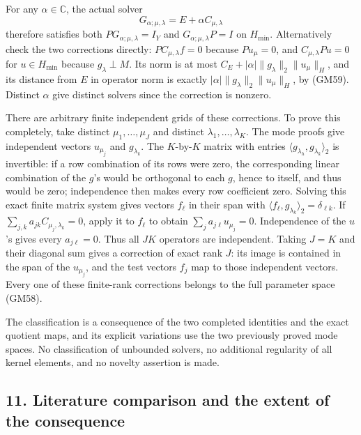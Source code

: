 \documentclass[
  11pt,
]{article}
\begin{document}
For any \(\alpha\in\mathbb C\), the actual solver
\[
 G_{\alpha;\mu,\lambda}=E+\alpha C_{\mu,\lambda}
\] therefore satisfies both
\(PG_{\alpha;\mu,\lambda}=I_Y\) and \(G_{\alpha;\mu,\lambda}P=I\) on
\(H_{\min}\). Alternatively check the two corrections
directly: \(PC_{\mu,\lambda}f=0\) because \(Pu_\mu=0\),
and \(C_{\mu,\lambda}Pu=0\) for \(u\in H_{\min}\) because
\(g_\lambda\perp M\). Its norm is at most
\(C_E+|\alpha|\|g_\lambda\|_2\|u_\mu\|_H\), and its distance from
\(E\) in operator norm is exactly
\(|\alpha|\|g_\lambda\|_2\|u_\mu\|_H\), by (GM59). Distinct
\(\alpha\) give distinct solvers since the correction is
nonzero.

There are arbitrary finite independent grids of these corrections. To
prove this completely, take distinct \(\mu_1,\ldots,\mu_J\) and
distinct \(\lambda_1,\ldots,\lambda_K\). The mode proofs give independent
vectors \(u_{\mu_j}\) and \(g_{\lambda_k}\). The
\(K\)-by-\(K\) matrix with
entries \(\langle g_{\lambda_h},g_{\lambda_k}\rangle_2\) is invertible: if a row combination
of its rows were zero, the corresponding linear combination of the
\(g\)'s would be orthogonal to each
\(g\), hence to itself, and thus would be zero;
independence then makes every row coefficient zero. Solving this exact
finite matrix system gives vectors \(f_\ell\) in their
span with \(\langle f_\ell,g_{\lambda_k}\rangle_2=\delta_{\ell k}\). If \(\sum_{j,k}a_{jk}C_{\mu_j,\lambda_k}=0\),
apply it to \(f_\ell\) to obtain
\(\sum_j a_{j\ell}u_{\mu_j}=0\). Independence of the
\(u\)'s gives every \(a_{j\ell}=0\).
Thus all \(JK\) operators are independent. Taking
\(J=K\) and their diagonal sum gives a correction of
exact rank \(J\): its image is contained in the
span of the \(u_{\mu_j}\), and the test vectors
\(f_j\) map to those independent vectors. Every one
of these finite-rank corrections belongs to the full parameter space
(GM58).

The classification is a consequence of the two completed identities and
the exact quotient maps, and its explicit variations use the two
previously proved mode spaces. No classification of unbounded solvers,
no additional regularity of all kernel elements, and no novelty
assertion is made.

\subsection{11. Literature comparison and the extent of the
consequence}\label{literature-comparison-and-the-extent-of-the-consequence}
\end{document}
